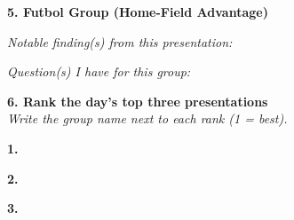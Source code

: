 \documentclass[11pt]{article}
\newcommand{\blankspace}[1]{%
  \vspace{0.3em}
  \begin{minipage}[t][#1][t]{\linewidth}
  \end{minipage}
  \vspace{0.3em}
}
\newcommand{\talk}[4]{%
  \par\noindent\textbf{#1. #2}\par
  \vspace{0.3em}\noindent\textit{Notable finding(s) from this presentation:}\par
  \blankspace{#3}\par
  \vspace{0.4em}
  \noindent\textit{Question(s) I have for this group:}\par
  \blankspace{#4}\par
}
\begin{document}
\vspace{0.8cm}

\talk{5}{Futbol Group (Home-Field Advantage)}{2.0cm}{1.3cm}

\vspace{0.8cm}

\noindent\textbf{6. Rank the day's top three presentations}\\[0.25em]
\textit{Write the group name next to each rank (1 = best).}

\vspace{1.1em}
\noindent\textbf{1.}\par
\blankspace{0.9cm}

\vspace{0.6em}
\noindent\textbf{2.}\par
\blankspace{0.9cm}

\vspace{0.6em}
\noindent\textbf{3.}\par
\blankspace{0.9cm}
\end{document}
